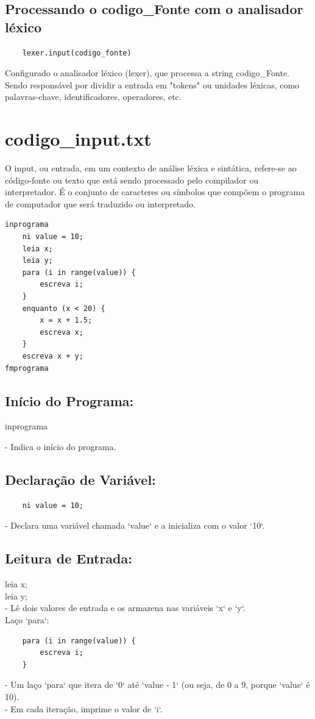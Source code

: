 \documentclass[a4paper,12pt]{article}
\begin{document}
\subsection{Processando o codigo\_Fonte com o analisador léxico}
\begin{verbatim}
    lexer.input(codigo_fonte)
\end{verbatim}
Configurado o analisador léxico (lexer), que processa a string 
codigo\_Fonte. Sendo responsável por dividir a entrada em "tokens" ou 
unidades léxicas, como palavras-chave, identificadores, operadores, etc.

\section{codigo\_input.txt}
O input, ou entrada, em um contexto de análise léxica e sintática, 
refere-se ao código-fonte ou texto que está sendo processado pelo 
compilador ou interpretador. É o conjunto de caracteres ou símbolos que 
compõem o programa de computador que será traduzido ou interpretado.

\begin{verbatim}
inprograma
    ni value = 10;
    leia x;
    leia y;
    para (i in range(value)) {
        escreva i;
    }
    enquanto (x < 20) {
        x = x + 1.5;
        escreva x;
    }
    escreva x + y;
fmprograma
\end{verbatim}

\subsection{Início do Programa:}
    inprograma
  
    - Indica o início do programa.
\\
\subsection{Declaração de Variável:}

\begin{verbatim}
    ni value = 10; 
\end{verbatim}

    - Declara uma variável chamada `value` e a inicializa com o valor 
    `10`.
\\    
\subsection{Leitura de Entrada:}

    leia x;
    \\
    leia y;
    \\
    - Lê dois valores de entrada e os armazena nas variáveis `x` e `y`.
\\
Laço `para`:
 \begin{verbatim}  
    para (i in range(value)) {
        escreva i;
    }
 \end{verbatim}   
    - Um laço `para` que itera de `0` até `value - 1` (ou seja, de 0 a 
    9, porque `value` é 10).
    \\
    - Em cada iteração, imprime o valor de `i`.
    
\end{document}
